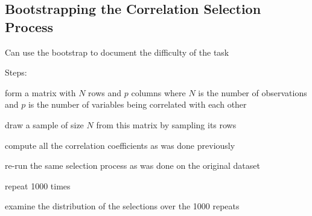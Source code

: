 \subsection{Bootstrapping the Correlation Selection Process}
\bi
\item Can use the bootstrap to document the difficulty of the task
\item Steps:
 \be 
 \item form a matrix with $N$ rows and $p$ columns where $N$ is the number of observations and $p$ is the number of variables being correlated with each other
 \item draw a sample of size $N$ from this matrix by sampling its rows
 \item compute all the correlation coefficients as was done previously
 \item re-run the same selection process as was done on the original dataset
 \item repeat 1000 times
 \item examine the distribution of the selections over the 1000 repeats
 \ee
\ei

